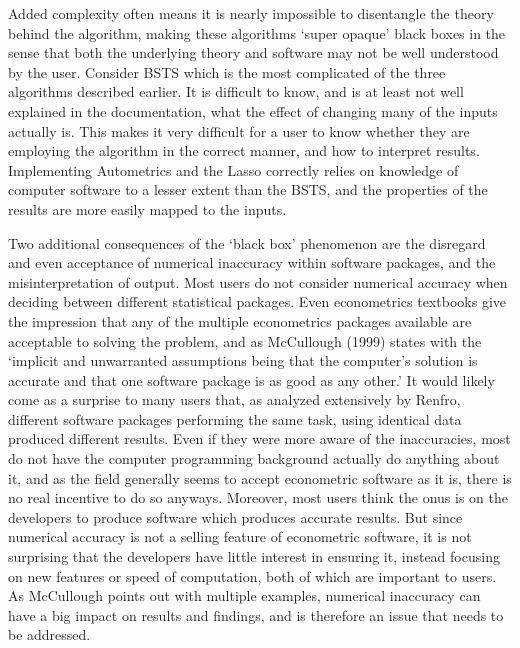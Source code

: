 Added complexity often means it is nearly impossible to disentangle the theory behind the algorithm, making these algorithms `super opaque' black boxes in the sense that both the underlying theory and software may not be well understood by the user.  Consider BSTS which is the most complicated of the three algorithms described earlier. It is difficult to know, and is at least not well explained in the documentation, what the effect of changing many of the inputs actually is. This makes it very difficult for a user to know whether they are employing the algorithm in the correct manner, and how to interpret results. Implementing Autometrics and the Lasso correctly relies on knowledge of computer software to a lesser extent than the BSTS, and the properties of the results are more easily mapped to the inputs. 

Two additional consequences of the `black box' phenomenon are the disregard and even acceptance of numerical inaccuracy within software packages, and the misinterpretation of output. Most users do not consider numerical accuracy when deciding between different statistical packages. Even econometrics textbooks give the impression that any of the multiple econometrics packages available are acceptable to solving the problem, and as McCullough (1999) states with the `implicit and unwarranted assumptions being that the computer's solution is accurate and that one software package is as good as any other.' It would likely come as a surprise to many users that, as analyzed extensively by Renfro, different software packages performing the same task, using identical data produced different results. Even if they were more aware of the inaccuracies, most do not have the computer programming background actually do anything about it, and as the field generally seems to accept econometric software as it is, there is no real incentive to do so anyways. Moreover, most users think the onus is on the developers to produce software which produces accurate results. But since numerical accuracy is not a selling feature of econometric software, it is not surprising that the developers have little interest in ensuring it, instead focusing on new features or speed of computation, both of which are important to users. As McCullough points out with multiple examples, numerical inaccuracy can have a big impact on results and findings, and is therefore an issue that needs to be addressed. 

